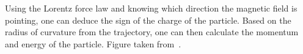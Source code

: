 \begin{multiFigure}
{        %
        Using the Lorentz force law and knowing which direction the magnetic field is pointing, one can deduce the sign of the charge of the particle. 
        Based on the radius of curvature from the trajectory, one can then calculate the momentum and energy of the particle.
        Figure taken from~\cite{PhysRevLett.114.191803}. %
        } 
    \label{fig:cms_particle_trajectories}
\end{multiFigure}
